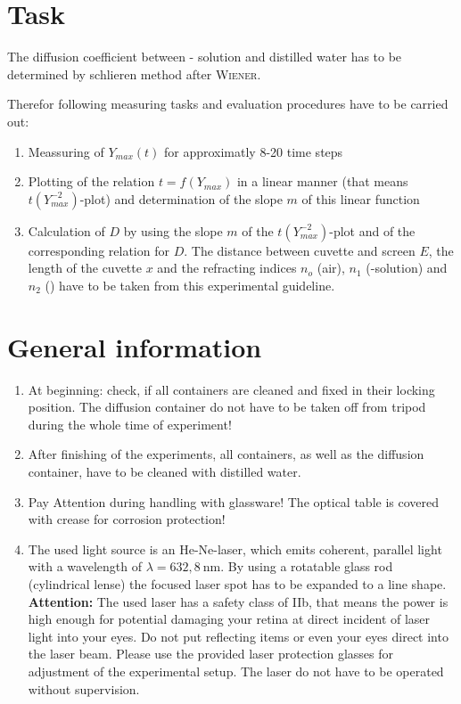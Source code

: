 \documentclass[platz]{tudphygp_eng}
\begin{document}
\maketitle

\section*{Task} 

The diffusion coefficient between - solution and distilled water has to be determined by schlieren method after \textsc{Wiener}.

\medskip

Therefor following measuring tasks and evaluation procedures have to be carried out:

\begin{enumerate}
 \item Meassuring of $Y_{max}(t)$ for approximatly 8-20 time steps
 \item Plotting of the relation $t=f(Y_{max})$ in a linear manner (that means $t(Y_{max}^{-2})$-plot) and determination of the slope $m$ of this linear function
 \item Calculation of $D$ by using the slope $m$ of the $t(Y_{max}^{-2})$-plot and of the corresponding relation for $D$. The distance between cuvette and screen $E$, the length of the cuvette $x$ and the refracting indices $n_o$ (air), $n_1$ (-solution) and $n_2$ () have to be taken from this experimental guideline. 
\end{enumerate}

\section*{General information}

\begin{enumerate}
 \item At beginning: check, if all containers are cleaned and fixed in their locking position. The diffusion container do not have to be taken off from tripod during the whole time of experiment!
 \item After finishing of the experiments, all containers, as well as the diffusion container, have to be cleaned with distilled water. 
 \item Pay Attention during handling with glassware! The optical table is covered with crease for corrosion protection!
 \item The used light source is an He-Ne-laser, which emits coherent, parallel light with a wavelength of $\lambda= 632,8 ~ \mathrm{nm}$. 
 By using a rotatable glass rod (cylindrical lense) the focused laser spot has to be expanded to a line shape.\\
 \textbf{Attention:} The used laser has a safety class of IIb, that means the power is high enough for potential damaging your retina at direct incident of laser light into your eyes. Do not put reflecting items or even your eyes direct into the laser beam. Please use the provided laser protection glasses for adjustment of the experimental setup. The laser do not have to be operated without supervision.  
\end{enumerate}
\end{document}
